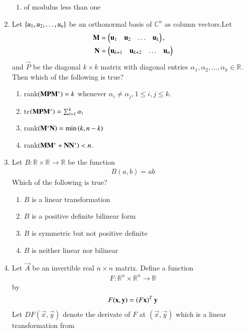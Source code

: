 \begin{enumerate}[label=\thesection.\arabic*.,ref=\thesection.\theenumi]
\begin{enumerate}
\item of modulus less than one
\end{enumerate}  
%
\item Let $\left\{u_1,u_2,\dots, u_n\right\}$ be an orthonormal basis of $\mathbb{C}^n$ as column vectors.Let 
\begin{align}
\mathbf{M} &= \begin{pmatrix}\mathbf{u}_1 & \mathbf{u}_2 & \dots & \mathbf{u}_k\end{pmatrix},
\\
\mathbf{N} &= \begin{pmatrix}\mathbf{u}_{k+1} & \mathbf{u}_{k+2} & \dots & \mathbf{u}_n\end{pmatrix}
\end{align}
%
and $\vec{P}$ be the diagonal $k \times k$ matrix with diagonal entries $\alpha_1,\alpha_2, \dots, \alpha_k \in \mathbb{R}$.  Then which of the following is true?
\begin{enumerate}
\item rank$\left(\mathbf{M}\mathbf{P}\mathbf{M}^*\right) = k$ whenever $\alpha_i \ne \alpha_j, 1 \le i, j \le k$.
\item tr$\left(\mathbf{M}\mathbf{P}\mathbf{M}^*\right) = \sum_{i=1}^{k}\alpha_i$
\item rank$\left(\mathbf{M}^*\mathbf{N}\right) = \min\left(k,n-k\right)$
\item rank$\left(\mathbf{M}\mathbf{M}^*+\mathbf{N}\mathbf{N}^*\right)  < n$.
\end{enumerate}  
%
\solution

\item Let $B: \mathbb{R} \times \mathbb{R} \to \mathbb{R}$ be the function
\begin{align}
B(a,b) = ab
\end{align}
Which of the following is true?
\begin{enumerate}
\item $B$ is a linear transformation
\item $B$ is a positive definite bilinear form
\item $B$ is symmetric but not positive definite
\item $B$ is neither linear nor bilinear
\end{enumerate}  
%
\item Let $\vec{A}$ be an invertible real $n \times n$ matrix.  Define a function
\begin{align}
F: \mathbb{R}^n \times \mathbb{R}^n \to \mathbb{R}
\end{align}
by 
\begin{align}
F(\mathbf{x},\mathbf{y}) = \left(F\mathbf{x}\right)^T\mathbf{y}
\end{align}
Let $DF(\vec{x},\vec{y}) $ denote the derivate of $F$ at $(\vec{x},\vec{y}) $ which is 
a linear transformation from 

\end{enumerate}
